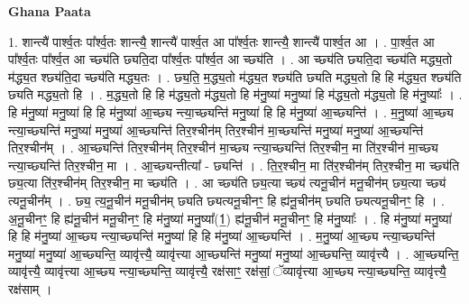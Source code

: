\documentclass[17pt]{extarticle}
\begin{document}
\textbf{Ghana Paata } \newline

1. शान्त्यै॑ पार्श्व॒तः पा᳚र्श्व॒तः शान्त्यै॒ शान्त्यै॑ पार्श्व॒त आ पा᳚र्श्व॒तः शान्त्यै॒ शान्त्यै॑ पार्श्व॒त आ । . पा॒र्श्व॒त आ पा᳚र्श्व॒तः पा᳚र्श्व॒त आ च्छ्य॑ति छ्यति॒दा पा᳚र्श्व॒तः पा᳚र्श्व॒त आ च्छ्य॑ति । . आ च्छ्य॑ति छ्यति॒दा च्छ्य॑ति मद्ध्य॒तो म॑द्ध्य॒त श्छ्य॑ति॒दा च्छ्य॑ति मद्ध्य॒तः । . छ्य॒ति॒ म॒द्ध्य॒तो म॑द्ध्य॒त श्छ्य॑ति छ्यति मद्ध्य॒तो हि हि म॑द्ध्य॒त श्छ्य॑ति छ्यति मद्ध्य॒तो हि । . म॒द्ध्य॒तो हि हि म॑द्ध्य॒तो म॑द्ध्य॒तो हि म॑नु॒ष्या॑ मनु॒ष्या॑ हि म॑द्ध्य॒तो म॑द्ध्य॒तो हि म॑नु॒ष्याः᳚ । . हि म॑नु॒ष्या॑ मनु॒ष्या॑ हि हि म॑नु॒ष्या॑ आ॒च्छ्य न्त्या॒च्छ्यन्ति॑ मनु॒ष्या॑ हि हि म॑नु॒ष्या॑ आ॒च्छ्यन्ति॑ । . म॒नु॒ष्या॑ आ॒च्छ्य न्त्या॒च्छ्यन्ति॑ मनु॒ष्या॑ मनु॒ष्या॑ आ॒च्छ्यन्ति॑ तिर॒श्चीन॑म् तिर॒श्चीन॑ मा॒च्छ्यन्ति॑ मनु॒ष्या॑ मनु॒ष्या॑ आ॒च्छ्यन्ति॑ तिर॒श्चीन᳚म् । . आ॒च्छ्यन्ति॑ तिर॒श्चीन॑म् तिर॒श्चीन॑ मा॒च्छ्य न्त्या॒च्छ्यन्ति॑ तिर॒श्चीन॒ मा ति॑र॒श्चीन॑ मा॒च्छ्य न्त्या॒च्छ्यन्ति॑ तिर॒श्चीन॒ मा । . आ॒च्छ्यन्तीत्या᳚ - छ्यन्ति॑ । . ति॒र॒श्चीन॒ मा ति॑र॒श्चीन॑म् तिर॒श्चीन॒ मा च्छ्य॑ति छ्य॒त्या ति॑र॒श्चीन॑म् तिर॒श्चीन॒ मा च्छ्य॑ति । . आ च्छ्य॑ति छ्य॒त्या च्छ्य॑ त्यनू॒चीन॑ मनू॒चीन॑म् छ्य॒त्या च्छ्य॑ त्यनू॒चीन᳚म् । . छ्य॒ त्य॒नू॒चीन॑ मनू॒चीन॑म् छ्यति छ्यत्यनू॒चीनꣳ॒॒ हि ह्य॑नू॒चीन॑म् छ्यति छ्यत्यनू॒चीनꣳ॒॒ हि । . अ॒नू॒चीनꣳ॒॒ हि ह्य॑नू॒चीन॑ मनू॒चीनꣳ॒॒ हि म॑नु॒ष्या॑ मनु॒ष्या᳚(1॒) ह्य॑नू॒चीन॑ मनू॒चीनꣳ॒॒ हि म॑नु॒ष्याः᳚ । . हि म॑नु॒ष्या॑ मनु॒ष्या॑ हि हि म॑नु॒ष्या॑ आ॒च्छ्य न्त्या॒च्छ्यन्ति॑ मनु॒ष्या॑ हि हि म॑नु॒ष्या॑ आ॒च्छ्यन्ति॑ । . म॒नु॒ष्या॑ आ॒च्छ्य न्त्या॒च्छ्यन्ति॑ मनु॒ष्या॑ मनु॒ष्या॑ आ॒च्छ्यन्ति॒ व्यावृ॑त्त्यै॒ व्यावृ॑त्त्या आ॒च्छ्यन्ति॑ मनु॒ष्या॑ मनु॒ष्या॑ आ॒च्छ्यन्ति॒ व्यावृ॑त्त्यै । . आ॒च्छ्यन्ति॒ व्यावृ॑त्त्यै॒ व्यावृ॑त्त्या आ॒च्छ्य न्त्या॒च्छ्यन्ति॒ व्यावृ॑त्त्यै॒ रक्ष॑साꣳ॒॒ रक्ष॑सां॒ ॅव्यावृ॑त्त्या आ॒च्छ्य न्त्या॒च्छ्यन्ति॒ व्यावृ॑त्त्यै॒ रक्ष॑साम् । \newline
\end{document}
